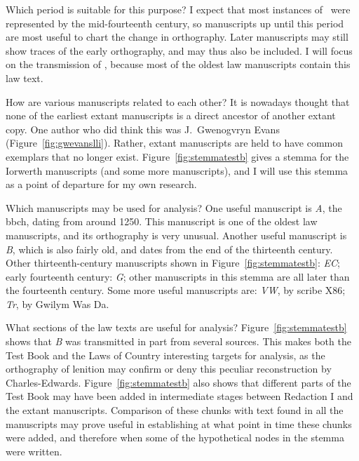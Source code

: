 Which period is suitable for this purpose?
I expect that most instances of \lT\ were represented by the mid-fourteenth century, so manuscripts up until this period are most useful to chart the change in orthography.
Later manuscripts may still show traces of the early orthography, and may thus also be included.
I will focus on the transmission of , because most of the oldest law manuscripts contain this law text.

How are various manuscripts related to each other?
It is nowadays thought that none of the earliest extant manuscripts is a direct ancestor of another extant copy.
One author who did think this was J.\ Gwenogvryn Evans (Figure~\ref{fig:gwevanslli}).
Rather, extant manuscripts are held to have common exemplars that no longer exist.
Figure~\ref{fig:stemmatestb} gives a stemma for the Iorwerth manuscripts (and some more manuscripts), and I will use this stemma as a point of departure for my own research.

Which manuscripts may be used for analysis?
One useful manuscript is \textit{A}, the \gls{bbch}, dating from around 1250. This manuscript is one of the oldest law manuscripts, and its orthography is very unusual.
Another useful manuscript is \textit{B}, which is also fairly old, and dates from the end of the thirteenth century.
Other thirteenth-century manuscripts shown in Figure~\ref{fig:stemmatestb}: \textit{EC};
early fourteenth century: \textit{G};
other manuscripts in this stemma are all later than the fourteenth century.
Some more useful manuscripts are: \textit{VW}, by scribe X86; \textit{Tr}, by Gwilym Was Da.

What sections of the law texts are useful for analysis?
Figure~\ref{fig:stemmatestb} shows that \textit{B} was  transmitted in part from several sources. This makes both the Test Book and the Laws of Country interesting targets for analysis, as the orthography of lenition may confirm or deny this peculiar reconstruction by Charles-Edwards.
Figure~\ref{fig:stemmatestb} also shows that different parts of the Test Book may have been added in intermediate stages between Redaction I and the extant manuscripts.
Comparison of these chunks with text found in all the manuscripts may prove useful in establishing at what point in time these chunks were added, and therefore when some of the hypothetical nodes in the stemma were written.

